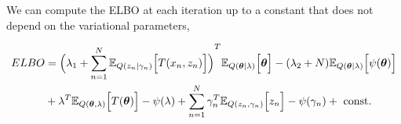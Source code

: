 We can compute the ELBO at each iteration up to a constant that does not depend on the variational parameters,

\[
  \begin{aligned}
    ELBO &= {\Big( \lambda_{1} + \sum_{n=1}^{N} \mathbb{E}_{Q(z_{n}\mid \gamma_{n})}\Big[T(x_{n},z_{n})\Big]\Big)}^{T}\mathbb{E}_{Q(\bm{\theta} \mid \lambda)}\Big[\bm{\theta}\Big] - (\lambda_{2} + N) \mathbb{E}_{Q(\bm{\theta} \mid \lambda)}\Big[\psi(\bm{\theta})\Big]\\
    &+ \lambda ^{T} \mathbb{E}_{Q(\bm{\theta}, \lambda)}\Big[T(\bm{\theta})\Big] - \psi(\lambda) + \sum_{n=1}^{N}\gamma_{n}^{T}\mathbb{E}_{Q(z_{n}, \gamma_{n})}\Big[z_{n}\Big] - \psi(\gamma_{n}) + \text{ const. }
  \end{aligned}
\]



